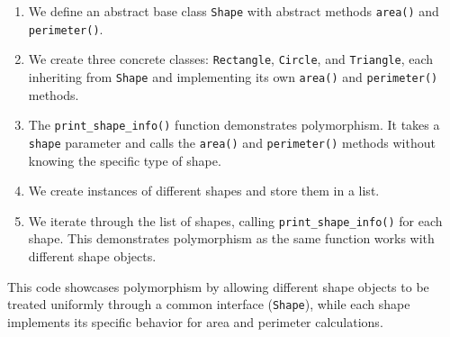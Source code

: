\begin{enumerate}
\def\labelenumi{\arabic{enumi}.}
\item
  We define an abstract base class \texttt{Shape} with abstract methods
  \texttt{area()} and \texttt{perimeter()}.
\item
  We create three concrete classes: \texttt{Rectangle}, \texttt{Circle},
  and \texttt{Triangle}, each inheriting from \texttt{Shape} and
  implementing its own \texttt{area()} and \texttt{perimeter()} methods.
\item
  The \texttt{print\_shape\_info()} function demonstrates polymorphism.
  It takes a \texttt{shape} parameter and calls the \texttt{area()} and
  \texttt{perimeter()} methods without knowing the specific type of
  shape.
\item
  We create instances of different shapes and store them in a list.
\item
  We iterate through the list of shapes, calling
  \texttt{print\_shape\_info()} for each shape. This demonstrates
  polymorphism as the same function works with different shape objects.
\end{enumerate}

This code showcases polymorphism by allowing different shape objects to
be treated uniformly through a common interface (\texttt{Shape}), while
each shape implements its specific behavior for area and perimeter
calculations.

\begin{Shaded}
\begin{Highlighting}[]
\end{Highlighting}
\end{Shaded}

